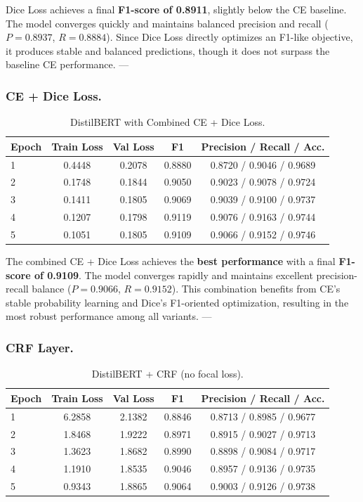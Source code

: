 Dice Loss achieves a final \textbf{F1-score of 0.8911}, slightly below the CE baseline. 
The model converges quickly and maintains balanced precision and recall ($P = 0.8937$, $R = 0.8884$). 
Since Dice Loss directly optimizes an F1-like objective, it produces stable and balanced predictions, though it does not surpass the baseline CE performance.
---

\subsubsection{CE + Dice Loss.}

\begin{table}[H]
\centering
\caption{DistilBERT with Combined CE + Dice Loss.}
\begin{tabular}{lcccc}
\hline
\textbf{Epoch} & \textbf{Train Loss} & \textbf{Val Loss} & \textbf{F1} & \textbf{Precision} / \textbf{Recall} / \textbf{Acc.} \\
\hline
1 & 0.4448 & 0.2078 & 0.8880 & 0.8720 / 0.9046 / 0.9689 \\
2 & 0.1748 & 0.1844 & 0.9050 & 0.9023 / 0.9078 / 0.9724 \\
3 & 0.1411 & 0.1805 & 0.9069 & 0.9039 / 0.9100 / 0.9737 \\
4 & 0.1207 & 0.1798 & 0.9119 & 0.9076 / 0.9163 / 0.9744 \\
5 & 0.1051 & 0.1805 & 0.9109 & 0.9066 / 0.9152 / 0.9746 \\
\hline
\end{tabular}
\label{tab:distilbert_ce_dice}
\end{table}

The combined CE + Dice Loss achieves the \textbf{best performance} with a final \textbf{F1-score of 0.9109}. 
The model converges rapidly and maintains excellent precision-recall balance ($P = 0.9066$, $R = 0.9152$). 
This combination benefits from CE's stable probability learning and Dice's F1-oriented optimization, resulting in the most robust performance among all variants.
---

\subsubsection{CRF Layer.}

\begin{table}[H]
\centering
\caption{DistilBERT + CRF (no focal loss).}
\begin{tabular}{lcccc}
\hline
\textbf{Epoch} & \textbf{Train Loss} & \textbf{Val Loss} & \textbf{F1} & \textbf{Precision} / \textbf{Recall} / \textbf{Acc.} \\
\hline
1 & 6.2858 & 2.1382 & 0.8846 & 0.8713 / 0.8985 / 0.9677 \\
2 & 1.8468 & 1.9222 & 0.8971 & 0.8915 / 0.9027 / 0.9713 \\
3 & 1.3623 & 1.8682 & 0.8990 & 0.8898 / 0.9084 / 0.9717 \\
4 & 1.1910 & 1.8535 & 0.9046 & 0.8957 / 0.9136 / 0.9735 \\
5 & 0.9343 & 1.8865 & 0.9064 & 0.9003 / 0.9126 / 0.9738 \\
\hline
\end{tabular}
\label{tab:distilbert_crf}
\end{table}

